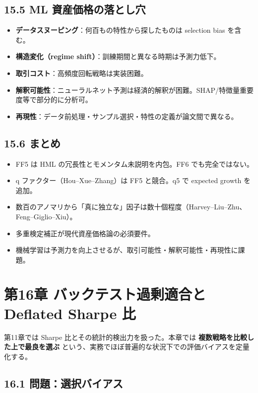 \documentclass[11pt,a4paper]{report}
\begin{document}
\section{15.5 ML 資産価格の落とし穴}

\begin{itemize}
\item \textbf{データスヌーピング}：何百もの特性から探したものは selection bias を含む。
\item \textbf{構造変化（regime shift）}：訓練期間と異なる時期は予測力低下。
\item \textbf{取引コスト}：高頻度回転戦略は実装困難。
\item \textbf{解釈可能性}：ニューラルネット予測は経済的解釈が困難。SHAP/特徴量重要度等で部分的に分析可。
\item \textbf{再現性}：データ前処理・サンプル選択・特性の定義が論文間で異なる。
\end{itemize}

\section{15.6 まとめ}

\begin{itemize}
\item FF5 は HML の冗長性とモメンタム未説明を内包。FF6 でも完全ではない。
\item q ファクター（Hou–Xue–Zhang）は FF5 と競合。q5 で expected growth を追加。
\item 数百のアノマリから「真に独立な」因子は数十個程度（Harvey–Liu–Zhu、Feng–Giglio–Xiu）。
\item 多重検定補正が現代資産価格論の必須要件。
\item 機械学習は予測力を向上させるが、取引可能性・解釈可能性・再現性に課題。
\end{itemize}

\noindent\hrulefill

\chapter{第16章 バックテスト過剰適合と Deflated Sharpe 比}

第11章では Sharpe 比とその統計的検出力を扱った。本章では \textbf{複数戦略を比較した上で最良を選ぶ} という、実務でほぼ普遍的な状況下での評価バイアスを定量化する。

\section{16.1 問題：選択バイアス}
\end{document}
